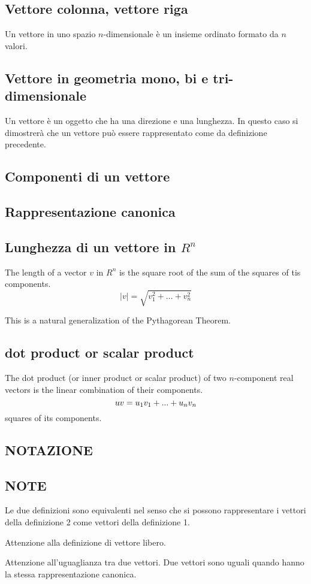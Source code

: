 \subsection{Vettore colonna, vettore riga}
Un vettore in uno spazio $n$-dimensionale è un insieme ordinato formato da $n$ valori. 

\subsection{Vettore in geometria mono, bi e tri-dimensionale}
Un vettore è un oggetto che ha una direzione e una lunghezza. In questo caso si dimostrerà che un vettore può essere
rappresentato come da definizione precedente.

\subsection{Componenti di un vettore}

\subsection{Rappresentazione canonica}

\subsection{Lunghezza di un vettore in $R^n$}
The length of a vector $v$ in $R^n$ is the square root of the sum of the squares of tis components.
\[
 |v|=\sqrt{v^2_1+...+v^2_n}
\]

This is a natural generalization of the Pythagorean Theorem.

\subsection{dot product or scalar product}
The dot product (or inner product or scalar product) of two $n$-component real vectors is the linear combination of their components.
\[
 u \dotfill v = u_1v_1+...+u_nv_n
\]
squares of its components.


\subsection{NOTAZIONE}

\subsection{NOTE}
Le due definizioni sono equivalenti nel senso che si possono rappresentare i vettori della definizione 2 come vettori
della definizione 1.

Attenzione alla definizione di vettore libero.

Attenzione all'uguaglianza tra due vettori. Due vettori sono uguali quando hanno la stessa rappresentazione canonica.



